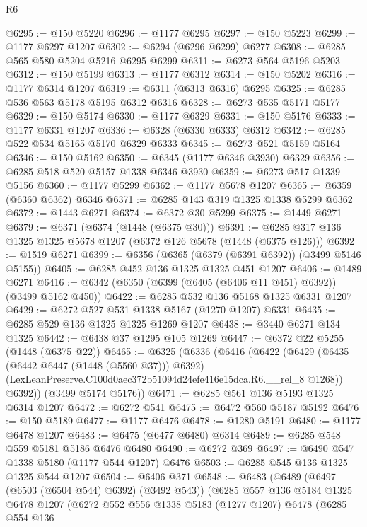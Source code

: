 \begin{lexlean}{R6}
\begin{coremodule}
@6295 := @150 @5220
@6296 := @1177 @6295
@6297 := @150 @5223
@6299 := @1177 @6297 @1207
@6302 := @6294 (@6296 @6299) @6277
@6308 := @6285 @565 @580 @5204 @5216 @6295 @6299
@6311 := @6273 @564 @5196 @5203
@6312 := @150 @5199
@6313 := @1177 @6312
@6314 := @150 @5202
@6316 := @1177 @6314 @1207
@6319 := @6311 (@6313 @6316) @6295
@6325 := @6285 @536 @563 @5178 @5195 @6312 @6316
@6328 := @6273 @535 @5171 @5177
@6329 := @150 @5174
@6330 := @1177 @6329
@6331 := @150 @5176
@6333 := @1177 @6331 @1207
@6336 := @6328 (@6330 @6333) @6312
@6342 := @6285 @522 @534 @5165 @5170 @6329 @6333
@6345 := @6273 @521 @5159 @5164
@6346 := @150 @5162
@6350 := @6345 (@1177 @6346 @3930) @6329
@6356 := @6285 @518 @520 @5157 @1338 @6346 @3930
@6359 := @6273 @517 @1339 @5156
@6360 := @1177 @5299
@6362 := @1177 @5678 @1207
@6365 := @6359 (@6360 @6362) @6346
@6371 := @6285 @143 @319 @1325 @1338 @5299 @6362
@6372 := @1443 @6271
@6374 := @6372 @30 @5299
@6375 := @1449 @6271
@6379 := @6371 (@6374 (@1448 (@6375 @30)))
@6391 := @6285 @317 @136 @1325 @1325 @5678 @1207 (@6372 @126 @5678 (@1448 (@6375 @126)))
@6392 := @1519 @6271
@6399 := @6356 (@6365 (@6379 (@6391 @6392)) (@3499 @5146 @5155))
@6405 := @6285 @452 @136 @1325 @1325 @451 @1207
@6406 := @1489 @6271
@6416 := @6342 (@6350 (@6399 (@6405 (@6406 @11 @451) @6392)) (@3499 @5162 @450))
@6422 := @6285 @532 @136 @5168 @1325 @6331 @1207
@6429 := @6272 @527 @531 @1338 @5167 (@1270 @1207) @6331
@6435 := @6285 @529 @136 @1325 @1325 @1269 @1207
@6438 := @3440 @6271 @134 @1325
@6442 := @6438 @37 @1295 @105 @1269
@6447 := @6372 @22 @5255 (@1448 (@6375 @22))
@6465 := @6325
    (@6336
      (@6416
        (@6422
          (@6429
            (@6435 (@6442 @6447 (@1448 (@5560 @37))) @6392)
            (LexLeanPreserve.C100d0aec372b51094d24efe416e15dca.R6.__rel_8 @1268))
          @6392))
      (@3499 @5174 @5176))
@6471 := @6285 @561 @136 @5193 @1325 @6314 @1207
@6472 := @6272 @541
@6475 := @6472 @560 @5187 @5192
@6476 := @150 @5189
@6477 := @1177 @6476
@6478 := @1280 @5191
@6480 := @1177 @6478 @1207
@6483 := @6475 (@6477 @6480) @6314
@6489 := @6285 @548 @559 @5181 @5186 @6476 @6480
@6490 := @6272 @369
@6497 := @6490 @547 @1338 @5180 (@1177 @544 @1207) @6476
@6503 := @6285 @545 @136 @1325 @1325 @544 @1207
@6504 := @6406 @371
@6548 := @6483
    (@6489
      (@6497 (@6503 (@6504 @544) @6392) (@3492 @543))
      (@6285
        @557
        @136
        @5184
        @1325
        @6478
        @1207
        (@6272
          @552
          @556
          @1338
          @5183
          (@1277 @1207)
          @6478
          (@6285
            @554
            @136

\end{coremodule}
\end{lexlean}

